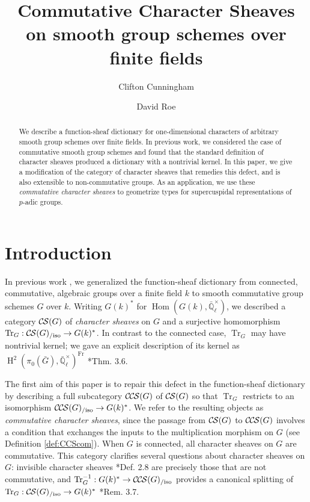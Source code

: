 \documentclass[10pt]{amsart}
\title[Commutative Character Sheaves]{Commutative Character Sheaves on smooth group schemes over finite fields}
\author{Clifton Cunningham}
\author{David Roe}
\theoremstyle{plain}
\theoremstyle{definition}
\newcommand{\EE}{\mathbb{\bar Q}_\ell}
\newcommand{\EEx}{\EE^\times}
\newcommand{\Frob}[1]{\operatorname{Fr}_{#1}}
\DeclareMathOperator{\Hom}{Hom}
\DeclareMathOperator{\Hh}{H}
\newcommand{\TrFrob}[1]{\operatorname{Tr}_{#1}}
\newcommand{\CS}{{\mathcal{C\hskip-0.8pt S}}}
\newcommand{\CCS}{{\mathcal{C\hskip-.8pt C\hskip-0.8pt S}}}
\newcommand{\CSiso}[1]{\CS(#1)_{/\text{iso}}}
\newcommand{\CCSiso}[1]{\CCS(#1)_{/\text{iso}}}
\newcommand{\bG}{\bar{G}}
\begin{document}
\begin{abstract}
We describe a function-sheaf dictionary for one-dimensional characters of arbitrary smooth group schemes
over finite fields.  In previous work, we considered the case of commutative smooth group schemes and found
that the standard definition of character sheaves produced a dictionary with a nontrivial kernel.  In this paper,
we give a modification of the category of character sheaves that remedies this defect, and is also extensible to
non-commutative groups.  
As an application, we use these \emph{commutative character sheaves} to geometrize types for
supercuspidal representations of $p$-adic groups. 
\end{abstract}

\maketitle

\tableofcontents

\section*{Introduction}

In previous work \cite{cunningham-roe:13a}, we generalized the function-sheaf dictionary from connected, commutative, algebraic groups
over a finite field $k$ to smooth commutative group schemes $G$ over $k$.  Writing $G(k)^*$ for $\Hom(G(k), \EEx)$, we described a category $\CS(G)$ of
\emph{character sheaves} on $G$ and a surjective homomorphism $\TrFrob{G} : \CSiso{G} \to G(k)^*$.
In contrast to the connected case, $\TrFrob{G}$ may have nontrivial kernel; we gave an explicit description of
its kernel as $\Hh^2(\pi_0(\bG), \EEx)^{\Frob{}}$ \cite{cunningham-roe:13a}*{Thm. 3.6}.  

The first aim of this paper is to repair this defect in the function-sheaf dictionary by describing a full subcategory
$\CCS(G)$ of $\CS(G)$ so that $\TrFrob{G}$ restricts to an isomorphism $\CCSiso{G} \to G(k)^*$.
We refer to the resulting objects as \emph{commutative character sheaves}, since the passage from $\CS(G)$
to $\CCS(G)$ involves a condition that exchanges the inputs to the multiplication morphism on $G$
(see Definition \ref{def:CCScom}).  When $G$ is connected, all character sheaves on $G$ are commutative.
This category clarifies several questions about character sheaves on $G$: invisible character sheaves
\cite{cunningham-roe:13a}*{Def. 2.8} are precisely those that are not commutative, and 
$\TrFrob{G}^{-1} : G(k)^* \to \CCSiso{G}$ provides a canonical splitting of
$\TrFrob{G} : \CSiso{G} \to G(k)^*$ \cite{cunningham-roe:13a}*{Rem. 3.7}.
\end{document}
